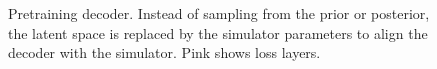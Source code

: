 \begin{figure}
\begin{tikzpicture}[shorten >=1pt,->,draw=black!50, node distance=\layersep and \layersep, myarrow/.style={-Stealth}]
        
\end{tikzpicture}
\caption{Pretraining decoder. Instead of sampling from the prior or posterior, the latent space is replaced by the simulator parameters to align the decoder with the simulator. Pink shows loss layers.}
\label{fig_pretrain_decoder}

\end{figure}



        
    
    
        

        
    
    
